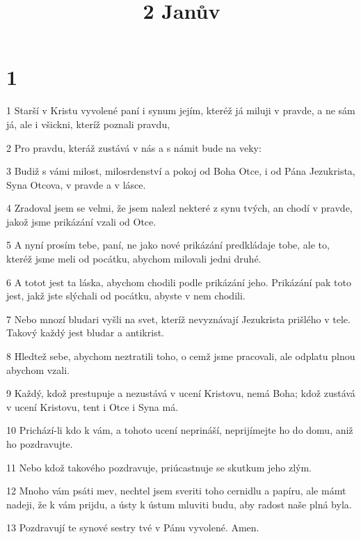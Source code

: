

\title{2 Janův}

\chapter{1}

\par 1 Starší v Kristu vyvolené paní i synum jejím, kteréž já miluji v pravde, a ne sám já, ale i všickni, kteríž poznali pravdu,
\par 2 Pro pravdu, kteráž zustává v nás a s námit bude na veky:
\par 3 Budiž s vámi milost, milosrdenství a pokoj od Boha Otce, i od Pána Jezukrista, Syna Otcova, v pravde a v lásce.
\par 4 Zradoval jsem se velmi, že jsem nalezl nekteré z synu tvých, an chodí v pravde, jakož jsme prikázání vzali od Otce.
\par 5 A nyní prosím tebe, paní, ne jako nové prikázání predkládaje tobe, ale to, kteréž jsme meli od pocátku, abychom milovali jedni druhé.
\par 6 A totot jest ta láska, abychom chodili podle prikázání jeho. Prikázání pak toto jest, jakž jste slýchali od pocátku, abyste v nem chodili.
\par 7 Nebo mnozí bludari vyšli na svet, kteríž nevyznávají Jezukrista prišlého v tele. Takový každý jest bludar a antikrist.
\par 8 Hledtež sebe, abychom neztratili toho, o cemž jsme pracovali, ale odplatu plnou abychom vzali.
\par 9 Každý, kdož prestupuje a nezustává v ucení Kristovu, nemá Boha; kdož zustává v ucení Kristovu, tent i Otce i Syna má.
\par 10 Prichází-li kdo k vám, a tohoto ucení neprináší, neprijímejte ho do domu, aniž ho pozdravujte.
\par 11 Nebo kdož takového pozdravuje, priúcastnuje se skutkum jeho zlým.
\par 12 Mnoho vám psáti mev, nechtel jsem sveriti toho cernidlu a papíru, ale mámt nadeji, že k vám prijdu, a ústy k ústum mluviti budu, aby radost naše plná byla.
\par 13 Pozdravují te synové sestry tvé v Pánu vyvolené. Amen.


